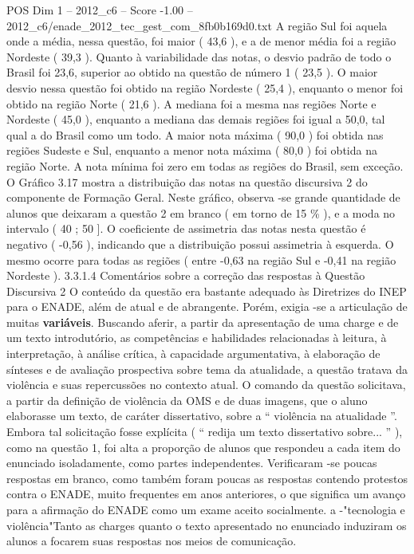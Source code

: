 \begin{textsample}{POS Dim 1 – 2012\_c6 – Score -1.00 – 2012\_c6/enade\_2012\_tec\_gest\_com\_8fb0b169d0.txt}
A região Sul foi aquela onde a média, nessa questão, foi maior ( 43,6 ), e a de menor média foi a região Nordeste ( 39,3 ).
Quanto à variabilidade das notas, o desvio padrão de todo o Brasil foi 23,6, superior ao obtido na questão de número 1 ( 23,5 ).
O maior desvio nessa questão foi obtido na região Nordeste ( 25,4 ), enquanto o menor foi obtido na região Norte ( 21,6 ).
A mediana foi a mesma nas regiões Norte e Nordeste ( 45,0 ), enquanto a mediana das demais regiões foi igual a 50,0, tal qual a do Brasil como um todo.
A maior nota máxima ( 90,0 ) foi obtida nas regiões Sudeste e Sul, enquanto a menor nota máxima ( 80,0 ) foi obtida na região Norte.
A nota mínima foi zero em todas as regiões do Brasil, sem exceção.
O Gráfico 3.17 mostra a distribuição das notas na questão discursiva 2 do componente de Formação Geral.
Neste gráfico, observa -se grande quantidade de alunos que deixaram a questão 2 em branco ( em torno de 15 \% ), e a moda no intervalo ( 40 ; 50 ].
O coeficiente de assimetria das notas nesta questão é negativo ( -0,56 ), indicando que a distribuição possui assimetria à esquerda.
O mesmo ocorre para todas as regiões ( entre -0,63 na região Sul e -0,41 na região Nordeste ). 3.3.1.4 Comentários sobre a correção das respostas à Questão Discursiva 2 O conteúdo da questão era bastante adequado às Diretrizes do INEP para o ENADE, além de atual e de abrangente.
Porém, exigia -se a articulação de muitas \textbf{variáveis}.
Buscando aferir, a partir da apresentação de uma charge e de um texto introdutório, as competências e habilidades relacionadas à leitura, à interpretação, à análise crítica, à capacidade argumentativa, à elaboração de sínteses e de avaliação prospectiva sobre tema da atualidade, a questão tratava da violência e suas repercussões no contexto atual.
O comando da questão solicitava, a partir da definição de violência da OMS e de duas imagens, que o aluno elaborasse um texto, de caráter dissertativo, sobre a “ violência na atualidade ”.
Embora tal solicitação fosse explícita ( “ redija um texto dissertativo sobre... ” ), como na questão 1, foi alta a proporção de alunos que respondeu a cada item do enunciado isoladamente, como partes independentes.
Verificaram -se poucas respostas em branco, como também foram poucas as respostas contendo protestos contra o ENADE, muito frequentes em anos anteriores, o que significa um avanço para a afirmação do ENADE como um exame aceito socialmente. a -"tecnologia e violência"Tanto as charges quanto o texto apresentado no enunciado induziram os alunos a focarem suas respostas nos meios de comunicação.

\end{textsample}
